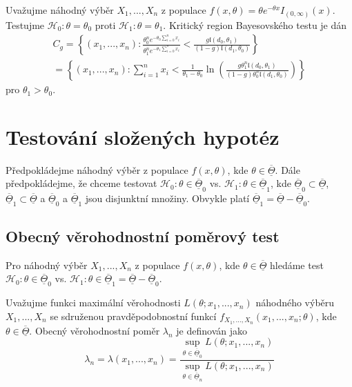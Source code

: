 \begin{example}
Uvažujme náhodný výběr $X_1, ..., X_n$ z populace $f(x, \theta) = \theta e^{-\theta x}I_{(0, \infty)}(x)$. Testujme $\mathscr{H}_0: \theta = \theta_0$ proti $\mathscr{H}_1: \theta = \theta_1$. Kritický region Bayesovského testu je dán
\begin{multline*}
C_g = \left\{(x_1, ..., x_n): \frac{\theta_0^n e^{-\theta_0 \sum_{i = 0}^n x_i}}{\theta_1^n e^{-\theta_1 \sum_{i = 0}^n x_i}} < \frac{g \mathfrak{l}(d_0, \theta_1)}{(1 - g)\mathfrak{l}(d_1, \theta_0)}\right\}\\
= \left\{(x_1, ..., x_n): \sum_{i = 1}^n x_i < \frac{1}{\theta_1 - \theta_0}\ln \left(\frac{g\theta_1^n\mathfrak{l}(d_0, \theta_1)}{(1 - g)\theta_0^n\mathfrak{l}(d_1, \theta_0)}\right)\right\}
\end{multline*}
pro $\theta_1 > \theta_0$.
\end{example}

\section{Testování složených hypotéz}

Předpokládejme náhodný výběr z populace $f(x, \theta)$, kde $\theta \in \overline{\underline{\Theta}}$. Dále předpokládejme, že chceme testovat $\mathscr{H}_0: \theta \in \overline{\underline{\Theta}}_0$ vs. $\mathscr{H}_1: \theta \in \overline{\underline{\Theta}}_1$, kde $\overline{\underline{\Theta}}_0 \subset \overline{\underline{\Theta}}$, $\overline{\underline{\Theta}}_1 \subset \overline{\underline{\Theta}}$ a $\overline{\underline{\Theta}}_0$ a $\overline{\underline{\Theta}}_1$ jsou disjunktní množiny. Obvykle platí $\overline{\underline{\Theta}}_1 = \overline{\underline{\Theta}} - \overline{\underline{\Theta}}_0$.

\subsection{Obecný věrohodnostní poměrový test}

Pro náhodný výběr $X_1, ..., X_n$ z populace $f(x, \theta)$, kde $\theta \in \overline{\underline{\Theta}}$ hledáme test $\mathscr{H}_0: \theta \in \overline{\underline{\Theta}}_0$ vs. $\mathscr{H}_1: \theta \in \overline{\underline{\Theta}}_1 = \overline{\underline{\Theta}} - \overline{\underline{\Theta}}_0$.

\begin{definition}
Uvažujme funkci maximální věrohodnosti $L(\theta; x_1, ..., x_n)$ náhodného výběru $X_1, ..., X_n$ se sdruženou pravděpodobnostní funkcí $f_{X_1, ..., X_n}(x_1, ..., x_n; \theta)$, kde $\theta \in \overline{\underline{\Theta}}$. Obecný věrohodnostní poměr $\lambda_n$ je definován jako
\begin{equation*}
\lambda_n = \lambda(x_1, ..., x_n) = \frac{\sup_{\theta \in \overline{\underline{\Theta}}_0} L(\theta; x_1, ..., x_n)}{\sup_{\theta \in \overline{\underline{\Theta}}_n}L(\theta; x_1, ..., x_n)}
\end{equation*}
\end{definition}


